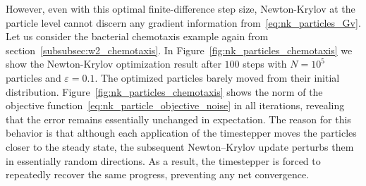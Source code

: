 \documentclass{article}
\begin{document}
However, even with this optimal finite-difference step size, Newton-Krylov at the particle level cannot discern any gradient information from~\eqref{eq:nk_particles_Gv}. Let us consider the bacterial chemotaxis example again from section~\ref{subsubsec:w2_chemotaxis}. In Figure~\ref{fig:nk_particles_chemotaxis} we show the Newton-Krylov optimization result after $100$ steps with $N=10^5$ particles and $\varepsilon = 0.1$. The optimized particles barely moved from their initial distribution. Figure~\ref{fig:nk_particles_chemotaxis} shows the norm of the objective function~\eqref{eq:nk_particle_objective_noise} in all iterations, revealing that the error remains essentially unchanged in expectation. The reason for this behavior is that although each application of the timestepper moves the particles closer to the steady state, the subsequent Newton–Krylov update perturbs them in essentially random directions. As a result, the timestepper is forced to repeatedly recover the same progress, preventing any net convergence.
\end{document}
